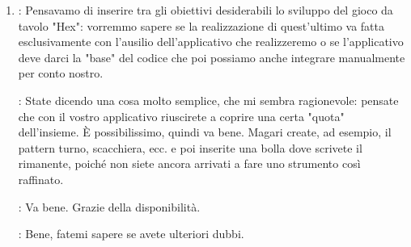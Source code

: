 \documentclass[../AnalisiDeiRequisiti.tex]{subfiles}
\begin{document}
\begin{enumerate}
		\item
		\kaleidoscode: Pensavamo di inserire tra gli obiettivi desiderabili lo sviluppo
		del gioco da tavolo "Hex": vorremmo sapere se la realizzazione di quest'ultimo va fatta
		esclusivamente con l'ausilio dell'applicativo che realizzeremo o se
		l'applicativo deve darci la "base" del codice che poi possiamo anche integrare
		manualmente per conto nostro.
		
		\proponente: State dicendo una cosa molto semplice, che mi sembra ragionevole:
		pensate che con il vostro applicativo riuscirete a coprire una certa
		"quota" dell'insieme. È possibilissimo, quindi va bene. Magari create, ad esempio,
		il pattern turno, scacchiera, ecc. e poi inserite una bolla dove scrivete il
		rimanente, poiché non siete ancora arrivati a fare uno strumento così raffinato.
		
		\kaleidoscode: Va bene. Grazie della disponibilità.
		
		\proponente: Bene, fatemi sapere se avete ulteriori dubbi.
		\end{enumerate}
\end{document}
